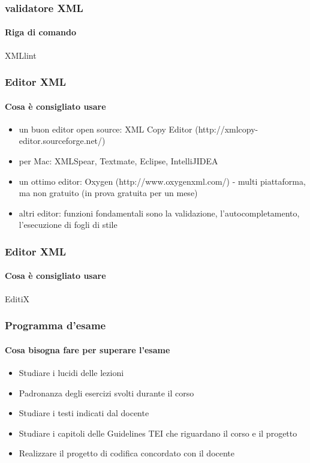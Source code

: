 \begin{frame}
	\frametitle{validatore XML}
	\framesubtitle{Riga di comando}
	\addtocounter{nframe}{1}

	\begin{block}{XMLlint}

	\end{block}

\end{frame}

\begin{frame}
	\frametitle{Editor XML}
	\framesubtitle{Cosa è consigliato usare}
	\addtocounter{nframe}{1}

	\begin{itemize}
		\item un buon editor open source: XML Copy Editor (http://xmlcopy-editor.sourceforge.net/)
		\item per Mac: XMLSpear, Textmate, Eclipse, IntelliJIDEA
		\item un ottimo editor: Oxygen (http://www.oxygenxml.com/) - multi piattaforma, ma non gratuito (in prova gratuita per un mese)
		\item altri editor: funzioni fondamentali sono la validazione, l’autocompletamento, l’esecuzione di fogli di stile
	\end{itemize}

\end{frame}

\begin{frame}
	\frametitle{Editor XML}
	\framesubtitle{Cosa è consigliato usare}
	\addtocounter{nframe}{1}

	\begin{block}{EditiX}

	\end{block}

\end{frame}

\begin{frame}
	\frametitle{Programma d’esame}
	\framesubtitle{Cosa bisogna fare per superare l'esame}
	\addtocounter{nframe}{1}

	\begin{itemize}
		\item Studiare i lucidi delle lezioni
		\item Padronanza degli esercizi svolti durante il corso
		\item Studiare i testi indicati dal docente
		\item Studiare i capitoli delle Guidelines TEI che riguardano il corso e il progetto
		\item Realizzare il progetto di codifica concordato con il docente
	\end{itemize}

\end{frame}

